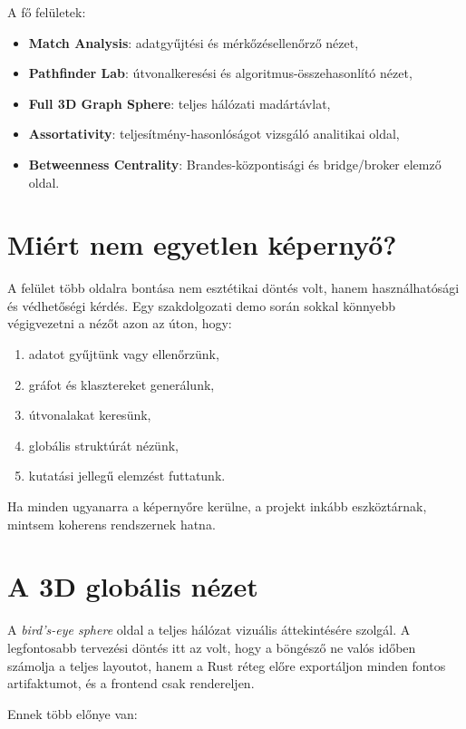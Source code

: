 ﻿\documentclass[a4paper,12pt]{report}
\begin{document}
A fő felületek:

\begin{itemize}
    \item \textbf{Match Analysis}: adatgyűjtési és mérkőzésellenőrző nézet,
    \item \textbf{Pathfinder Lab}: útvonalkeresési és algoritmus-összehasonlító nézet,
    \item \textbf{Full 3D Graph Sphere}: teljes hálózati madártávlat,
    \item \textbf{Assortativity}: teljesítmény-hasonlóságot vizsgáló analitikai oldal,
    \item \textbf{Betweenness Centrality}: Brandes-központisági és bridge/broker elemző oldal.
\end{itemize}

\section{Miért nem egyetlen képernyő?}

A felület több oldalra bontása nem esztétikai döntés volt, hanem használhatósági és védhetőségi kérdés. Egy szakdolgozati demo során sokkal könnyebb végigvezetni a nézőt azon az úton, hogy:

\begin{enumerate}
    \item adatot gyűjtünk vagy ellenőrzünk,
    \item gráfot és klasztereket generálunk,
    \item útvonalakat keresünk,
    \item globális struktúrát nézünk,
    \item kutatási jellegű elemzést futtatunk.
\end{enumerate}

Ha minden ugyanarra a képernyőre kerülne, a projekt inkább eszköztárnak, mintsem koherens rendszernek hatna.

\section{A 3D globális nézet}

A \emph{bird's-eye sphere} oldal a teljes hálózat vizuális áttekintésére szolgál. A legfontosabb tervezési döntés itt az volt, hogy a böngésző ne valós időben számolja a teljes layoutot, hanem a Rust réteg előre exportáljon minden fontos artifaktumot, és a frontend csak rendereljen.

Ennek több előnye van:
\end{document}
